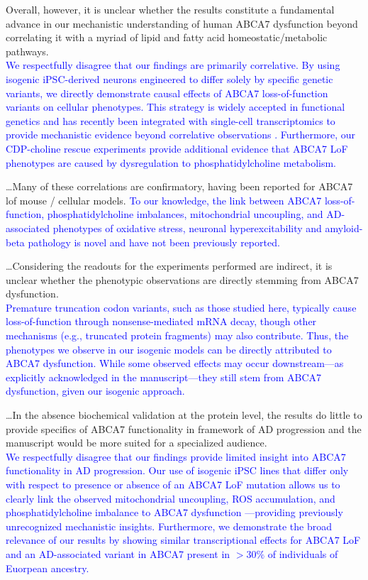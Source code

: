 \documentclass[12pt]{article}
\begin{document}
Overall, however, it is unclear whether the results constitute a fundamental advance in our mechanistic understanding of human ABCA7 dysfunction beyond correlating it with a myriad of lipid and fatty acid homeostatic/metabolic pathways.\\
\textcolor{blue}{We respectfully disagree that our findings are primarily correlative. By using isogenic iPSC-derived neurons engineered to differ solely by specific genetic variants, we directly demonstrate causal effects of ABCA7 loss-of-function variants on cellular phenotypes. This strategy is widely accepted in functional genetics and has recently been integrated with single-cell transcriptomics to provide mechanistic evidence beyond correlative observations \cite{Haney2024-bp,Sun2023-fo}. Furthermore, our CDP-choline rescue experiments provide additional evidence that ABCA7 LoF phenotypes are caused by dysregulation to phosphatidylcholine metabolism.}

\dots Many of these correlations are confirmatory, having been reported for ABCA7 lof mouse / cellular models. 
\textcolor{blue}{To our knowledge, the link between ABCA7 loss-of-function, phosphatidylcholine imbalances, mitochondrial uncoupling, and AD-associated phenotypes of oxidative stress, neuronal hyperexcitability and amyloid-beta pathology is novel and have not been previously reported.}

\dots Considering the readouts for the experiments performed are indirect, it is unclear whether the phenotypic observations are directly stemming from ABCA7 dysfunction.\\ 
\textcolor{blue}{Premature truncation codon variants, such as those studied here, typically cause loss-of-function through nonsense-mediated mRNA decay, though other mechanisms (e.g., truncated protein fragments) may also contribute. Thus, the phenotypes we observe in our isogenic models can be directly attributed to ABCA7 dysfunction. While some observed effects may occur downstream—as explicitly acknowledged in the manuscript—they still stem from ABCA7 dysfunction, given our isogenic approach.}

\dots In the absence biochemical validation at the protein level, the results do little to provide specifics of ABCA7 functionality in framework of AD progression and the manuscript would be more suited for a specialized audience.\\ 
\textcolor{blue}{We respectfully disagree that our findings provide limited insight into ABCA7 functionality in AD progression. Our use of isogenic iPSC lines that differ only with respect to presence or absence of an ABCA7 LoF mutation allows us to clearly link the observed mitochondrial uncoupling, ROS accumulation, and phosphatidylcholine imbalance to ABCA7 dysfunction —providing previously unrecognized mechanistic insights. Furthermore, we demonstrate the broad relevance of our results by showing similar transcriptional effects for ABCA7 LoF and an  AD-associated variant in ABCA7 present in $>30\%$ of individuals of Euorpean ancestry.}
\end{document}
